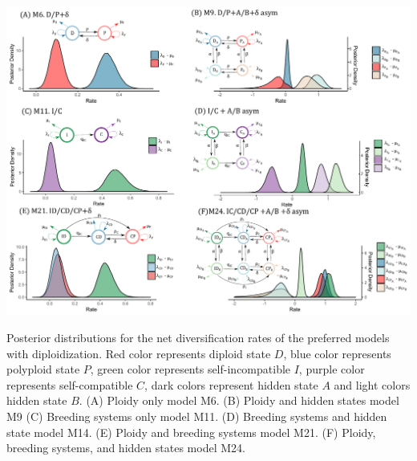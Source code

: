 \begin{suppfigure}
\includegraphics[width=\textwidth]{figS18.pdf}
\caption{Posterior distributions for the net diversification rates of the preferred models with diploidization. Red color represents diploid state $D$, blue color represents polyploid state $P$, green color represents self-incompatible $I$, purple color represents self-compatible $C$,  dark colors represent hidden state $A$ and light colors hidden state $B$.  (A) Ploidy only model M6. (B) Ploidy and hidden states model M9 (C) Breeding systems only model M11. (D) Breeding systems and hidden state model M14. (E) Ploidy and breeding systems model M21. (F) Ploidy, breeding systems, and hidden states model M24.} %
\label{suppfigure:alldip}
\end{suppfigure}

